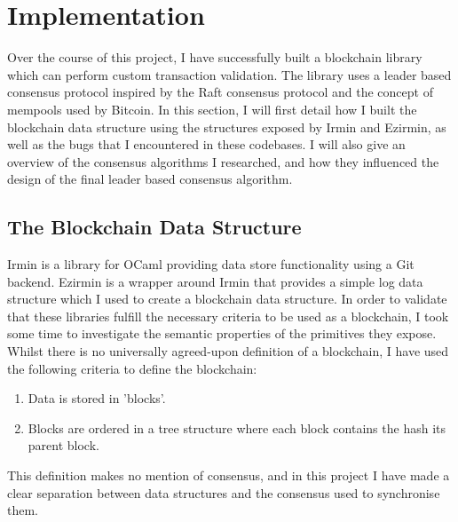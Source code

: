 \documentclass[12pt,a4paper,twoside,openright]{report}
\begin{document}
	\chapter{Implementation} \label{Implementation}
	Over the course of this project, I have successfully built a blockchain library which can perform custom transaction validation.
	The library uses a leader based consensus protocol inspired by the Raft consensus protocol and the concept of mempools used by Bitcoin.
	In this section, I will first detail how I built the blockchain data structure using the structures exposed by Irmin and Ezirmin, as well as the bugs that I encountered in these codebases.
	I will also give an overview of the consensus algorithms I researched, and how they influenced the design of the final leader based consensus algorithm.
	\section{The Blockchain Data Structure}
	Irmin is a library for OCaml providing data store functionality using a Git backend.
	Ezirmin is a wrapper around Irmin that provides a simple log data structure which I used to create a blockchain data structure.
	In order to validate that these libraries fulfill the necessary criteria to be used as a blockchain, I took some time to investigate the semantic properties of the primitives they expose. 
	Whilst there is no universally agreed-upon definition of a blockchain, I have used the following criteria to define the blockchain:
	\begin{enumerate}
		\item Data is stored in 'blocks'.
		\item Blocks are ordered in a tree structure where each block contains the hash its parent block.
	\end{enumerate}
	This definition makes no mention of consensus, and in this project I have made a clear separation between data structures and the consensus used to synchronise them.
\end{document}
